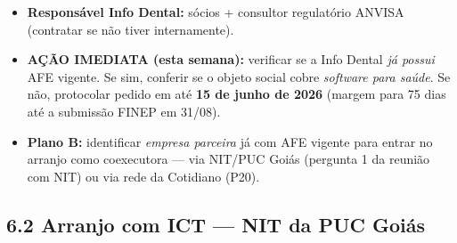 \documentclass[11pt, a4paper]{article}
\begin{document}
\begin{itemize}[label=\textcolor{primaryColor}{$\blacktriangleright$}, leftmargin=1.6em]
    \item \textbf{Responsável Info Dental:} sócios + consultor regulatório ANVISA (contratar se não tiver internamente).
    \item \textcolor{accentColor}{\textbf{AÇÃO IMEDIATA (esta semana):}} verificar se a Info Dental \emph{já possui} AFE vigente. Se sim, conferir se o objeto social cobre \textit{software para saúde}. Se não, protocolar pedido em até \textbf{15 de junho de 2026} (margem para 75 dias até a submissão FINEP em 31/08).
    \item \textbf{Plano B:} identificar \emph{empresa parceira} já com AFE vigente para entrar no arranjo como coexecutora --- via NIT/PUC Goiás (pergunta 1 da reunião com NIT) ou via rede da Cotidiano (P20).
\end{itemize}

\subsection{6.2 Arranjo com ICT --- NIT da PUC Goiás}
\end{document}
